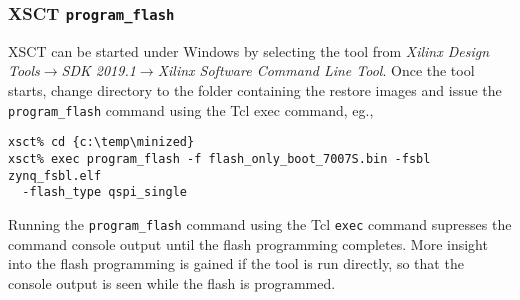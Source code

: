 \subsubsection{XSCT \texttt{program\_flash}}

XSCT can be started under Windows by selecting the tool from
\emph{Xilinx Design Tools}$\rightarrow$\emph{SDK 2019.1}$\rightarrow$\emph{Xilinx
Software Command Line Tool}. Once the tool starts, change directory to
the folder containing the restore images and issue the \verb+program_flash+
command using the Tcl exec command, eg.,
%
\begin{verbatim}
xsct% cd {c:\temp\minized}
xsct% exec program_flash -f flash_only_boot_7007S.bin -fsbl zynq_fsbl.elf
  -flash_type qspi_single
\end{verbatim}
%
Running the \verb+program_flash+ command using the Tcl \verb+exec+ command
supresses the command console output until the flash programming completes.
More insight into the flash programming is gained if the tool is
run directly, so that the console output is seen while the flash is
programmed.

